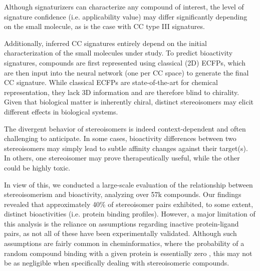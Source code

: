 Although signaturizers can characterize any compound of interest, the level of signature confidence (i.e. applicability value) may differ significantly depending on the small molecule, as is the case with CC type III signatures. 


Additionally, inferred CC signatures entirely depend on the initial characterization of the small molecules under study. To predict bioactivity signatures, compounds are first represented using classical (2D) ECFPs, which are then input into the neural network (one per CC space) to generate the final CC signature. While classical ECFPs are state-of-the-art for chemical representation, they lack 3D information and are therefore blind to chirality. Given that biological matter is inherently chiral, distinct stereoisomers may elicit different effects in biological systems. 

The divergent behavior of stereoisomers is indeed context-dependent and often challenging to anticipate. In some cases, bioactivity differences between two stereoisomers may simply lead to subtle affinity changes against their target(s). In others, one stereoisomer may prove therapeutically useful, while the other could be highly toxic. 

In view of this, we conducted a large-scale evaluation of the relationship between stereoisomerism and bioactivity, analyzing over 57k compounds. Our findings revealed that approximately 40\% of stereoisomer pairs exhibited, to some extent, distinct bioactivities (i.e. protein binding profiles). However, a major limitation of this analysis is the reliance on assumptions regarding inactive protein-ligand pairs, as not all of these have been experimentally validated. Although such assumptions are fairly common in cheminformatics, where the probability of a random compound binding with a given protein is essentially zero \cite{dobson_chemical_2004}, this may not be as negligible when specifically dealing with stereoisomeric compounds. 

